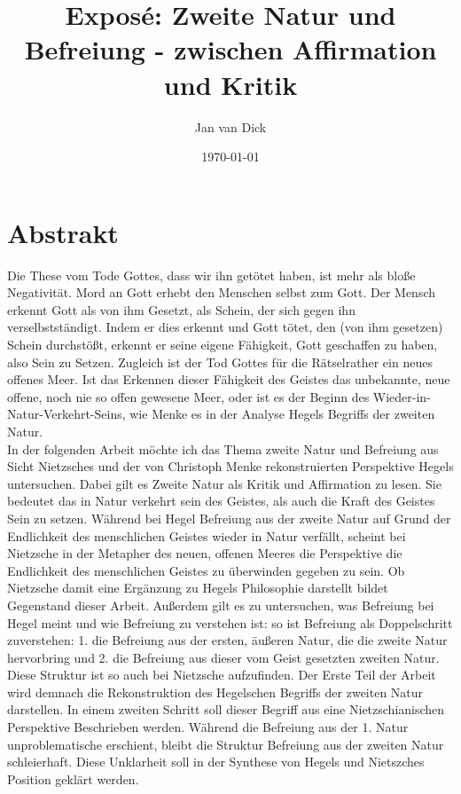\documentclass[a4paper, 12pt]{article}
\title{Exposé: \glqq Zweite Natur und Befreiung - zwischen Affirmation und Kritik\grqq}
\author{Jan van Dick}
\date{\today}
\begin{document}
\maketitle

\section{Abstrakt}
Die These vom Tode Gottes, dass \glqq wir\grqq{} ihn getötet haben, ist mehr als bloße Negativität. 
 Mord an Gott erhebt den Menschen selbst zum Gott. 
Der Mensch erkennt Gott als von ihm Gesetzt, als Schein, der sich gegen ihn verselbstständigt. 
Indem er dies erkennt und Gott tötet, den (von ihm gesetzen) Schein durchstößt, erkennt er seine eigene Fähigkeit, Gott geschaffen zu haben, also Sein zu Setzen.
Zugleich ist der Tod Gottes für die \glqq Rätselrather\grqq{} ein \glqq neues offenes Meer\grqq{}.
Ist das Erkennen dieser Fähigkeit des Geistes das unbekannte, neue offene, noch nie so offen gewesene Meer, oder ist es der Beginn des Wieder-in-Natur-Verkehrt-Seins, wie Menke es in der Analyse Hegels Begriffs der zweiten Natur.\\
In der folgenden Arbeit möchte ich das Thema zweite Natur und Befreiung aus Sicht Nietzsches und der von Christoph Menke rekonstruierten Perspektive Hegels untersuchen.
Dabei gilt es Zweite Natur als Kritik und Affirmation zu lesen. 
Sie bedeutet das in Natur verkehrt sein des Geistes, als auch die Kraft des Geistes Sein zu setzen. 
Während bei Hegel Befreiung aus der zweite Natur auf Grund der Endlichkeit des menschlichen Geistes wieder in Natur verfällt, scheint bei Nietzsche in der Metapher des neuen, offenen Meeres die Perspektive die Endlichkeit des menschlichen Geistes zu überwinden gegeben zu sein. 
Ob Nietzsche damit eine Ergänzung zu Hegels Philosophie darstellt bildet Gegenstand dieser Arbeit. 
Außerdem gilt es zu untersuchen, was Befreiung bei Hegel meint und wie Befreiung zu verstehen ist:
so ist Befreiung als Doppelschritt zuverstehen: 1. die Befreiung aus der ersten, äußeren Natur, die die zweite Natur hervorbring und 2. die Befreiung aus dieser vom Geist gesetzten zweiten Natur.
Diese Struktur ist so auch bei Nietzsche aufzufinden. 
Der Erste Teil der Arbeit wird demnach die Rekonstruktion des Hegelschen Begriffs der zweiten Natur darstellen. 
In einem zweiten Schritt soll dieser Begriff aus eine Nietzschianischen Perspektive Beschrieben werden. 
Während die Befreiung aus der 1. Natur unproblematische erschient, bleibt die Struktur Befreiung aus der zweiten Natur schleierhaft.
Diese Unklarheit soll in der Synthese von Hegels und Nietszches Position geklärt werden. 
\end{document}

